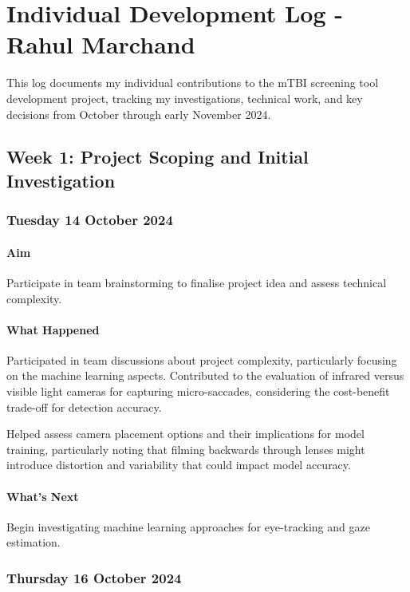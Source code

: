 \section{Individual Development Log - Rahul Marchand}

This log documents my individual contributions to the mTBI screening tool development project, tracking my investigations, technical work, and key decisions from October through early November 2024.

\subsection{Week 1: Project Scoping and Initial Investigation}

\subsubsection*{Tuesday 14 October 2024}

\paragraph{Aim}
Participate in team brainstorming to finalise project idea and assess technical complexity.

\paragraph{What Happened}
Participated in team discussions about project complexity, particularly focusing on the machine learning aspects. Contributed to the evaluation of infrared versus visible light cameras for capturing micro-saccades, considering the cost-benefit trade-off for detection accuracy.

Helped assess camera placement options and their implications for model training, particularly noting that filming backwards through lenses might introduce distortion and variability that could impact model accuracy.

\paragraph{What's Next}
Begin investigating machine learning approaches for eye-tracking and gaze estimation.

\subsubsection*{Thursday 16 October 2024}

